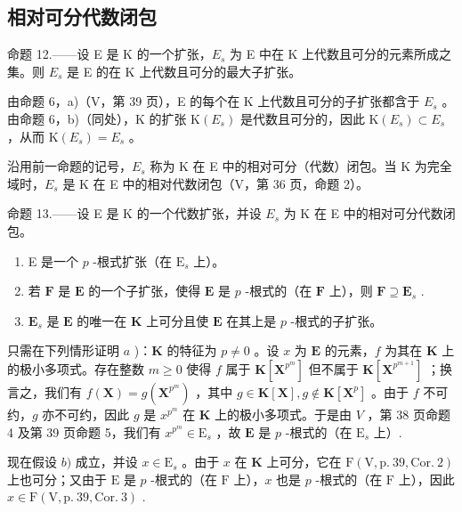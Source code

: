 \subsection{相对可分代数闭包}

命题 12.——设 E 是 K 的一个扩张，\(E_{s}\) 为 E 中在 K 上代数且可分的元素所成之集。则 \(E_{s}\) 是 E 的在 K 上代数且可分的最大子扩张。

由命题 6，a)（V，第 39 页），E 的每个在 K 上代数且可分的子扩张都含于 \(E_{s}\) 。由命题 6，b)（同处），K 的扩张 \(\mathrm{K}(E_{s})\) 是代数且可分的，因此 \(\mathrm{K}(E_{s}) \subset E_{s}\) ，从而 \(\mathrm{K}(E_{s}) = E_{s}\) 。

沿用前一命题的记号，\(E_{s}\) 称为 K 在 E 中的相对可分（代数）闭包。当 K 为完全域时，\(E_{s}\) 是 K 在 E 中的相对代数闭包（V，第 36 页，命题 2）。

命题 13.——设 E 是 K 的一个代数扩张，并设 \(E_{s}\) 为 K 在 E 中的相对可分代数闭包。

\begin{enumerate}
\def\labelenumi{\alph{enumi})}
\item
  E 是一个 \(p\) -根式扩张（在 \(\mathrm{E}_s\) 上）。
\item
  若 \(\mathbf{F}\) 是 \(\mathbf{E}\) 的一个子扩张，使得 \(\mathbf{E}\) 是 \(p\) -根式的（在 \(\mathbf{F}\) 上），则 \(\mathbf{F} \supseteq \mathbf{E}_s\) .
\item
  \(\mathbf{E}_s\) 是 \(\mathbf{E}\) 的唯一在 \(\mathbf{K}\) 上可分且使 \(\mathbf{E}\) 在其上是 \(p\) -根式的子扩张。
\end{enumerate}

只需在下列情形证明 \(a\) )：\(\mathbf{K}\) 的特征为 \(p \neq 0\) 。设 \(x\) 为 \(\mathbf{E}\) 的元素，\(f\) 为其在 \(\mathbf{K}\) 上的极小多项式。存在整数 \(m \geqslant 0\) 使得 \(f\) 属于 \(\mathbf{K}[\mathbf{X}^{p^m}]\) 但不属于 \(\mathbf{K}[\mathbf{X}^{p^{m+1}}]\) ；换言之，我们有 \(f(\mathbf{X}) = g(\mathbf{X}^{p^m})\) ，其中 \(g \in \mathbf{K}[\mathbf{X}], g \notin \mathbf{K}[\mathbf{X}^p]\) 。由于 \(f\) 不可约，\(g\) 亦不可约，因此 \(g\) 是 \(x^{p^m}\) 在 \(\mathbf{K}\) 上的极小多项式。于是由 \(V\) ，第 38 页命题 4 及第 39 页命题 5，我们有 \(x^{p^m} \in \mathrm{E}_s\) ，故 \(\mathbf{E}\) 是 \(p\) -根式的（在 \(\mathrm{E}_s\) 上）.

现在假设 \(b)\) 成立，并设 \(x \in \mathrm{E}_s\) 。由于 \(x\) 在 \(\mathbf{K}\) 上可分，它在 \(\mathrm{F}(\mathrm{V}, \mathrm{p.~39}, \mathrm{Cor.~2})\) 上也可分；又由于 \(\mathrm{E}\) 是 \(p\) -根式的（在 \(\mathrm{F}\) 上），\(x\) 也是 \(p\) -根式的（在 \(\mathrm{F}\) 上），因此 \(x \in \mathrm{F}(\mathrm{V}, \mathrm{p.~39}, \mathrm{Cor.~3})\) .

